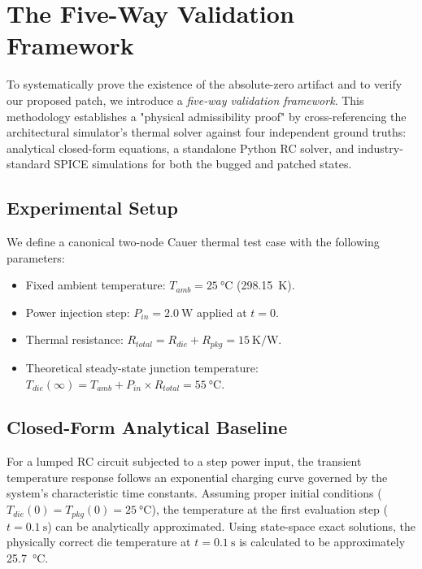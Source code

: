 \section{The Five-Way Validation Framework}
\label{sec:validation}

To systematically prove the existence of the absolute-zero artifact and to verify our proposed patch, we introduce a \emph{five-way validation framework}. This methodology establishes a "physical admissibility proof" by cross-referencing the architectural simulator's thermal solver against four independent ground truths: analytical closed-form equations, a standalone Python RC solver, and industry-standard SPICE simulations for both the bugged and patched states.

\subsection{Experimental Setup}

We define a canonical two-node Cauer thermal test case with the following parameters:
\begin{itemize}
    \item Fixed ambient temperature: $T_{amb} = \SI{25}{\degreeCelsius}$ (\SI{298.15}{\kelvin}).
    \item Power injection step: $P_{in} = \SI{2.0}{\watt}$ applied at $t=0$.
    \item Thermal resistance: $R_{total} = R_{die} + R_{pkg} = \SI{15}{\kelvin\per\watt}$.
    \item Theoretical steady-state junction temperature: $T_{die}(\infty) = T_{amb} + P_{in} \times R_{total} = \SI{55}{\degreeCelsius}$.
\end{itemize}

\subsection{Closed-Form Analytical Baseline}

For a lumped RC circuit subjected to a step power input, the transient temperature response follows an exponential charging curve governed by the system's characteristic time constants. Assuming proper initial conditions ($T_{die}(0) = T_{pkg}(0) = \SI{25}{\degreeCelsius}$), the temperature at the first evaluation step ($t = \SI{0.1}{\second}$) can be analytically approximated. Using state-space exact solutions, the physically correct die temperature at $t = \SI{0.1}{\second}$ is calculated to be approximately \SI{25.7}{\degreeCelsius}.

